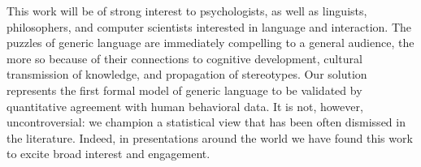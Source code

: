 \documentclass[11pt,letterpaper]{letter} %
\begin{document}
\begin{letter}
This work will be of strong interest to psychologists, as well as linguists, philosophers, and computer scientists interested in language and interaction.
The puzzles of generic language are immediately compelling to a general audience, the more so because of their connections to cognitive development, cultural transmission of knowledge, and propagation of stereotypes.
Our solution represents the first formal model of generic language to be validated by quantitative agreement with human behavioral data.
It is not, however, uncontroversial: we champion a statistical view that has been often dismissed in the literature.
Indeed, in presentations around the world we have found this work to excite broad interest and engagement.









%




\end{letter}
\end{document}
